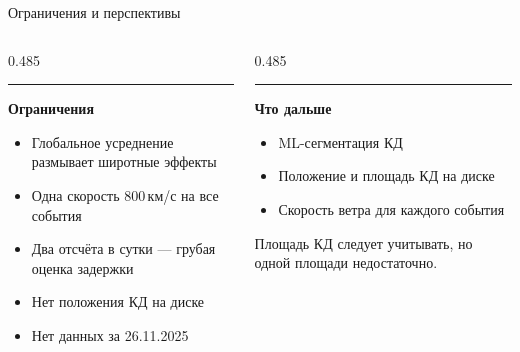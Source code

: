 \documentclass[aspectratio=169,11pt]{beamer}
\begin{document}
\begin{frame}[t]{Ограничения и перспективы}
\begin{columns}[T,onlytextwidth]
\begin{column}[T]{0.485\textwidth}
  {\color{muted}\rule{\linewidth}{1.4pt}}\par\vspace{1.6mm}
  {\bfseries Ограничения}\par\vspace{1mm}
  {\footnotesize
  \begin{itemize}
    \item Глобальное усреднение размывает широтные эффекты
    \item Одна скорость 800\,км/с на все события
    \item Два отсчёта в сутки --- грубая оценка задержки
    \item Нет положения КД на диске
    \item Нет данных за 26.11.2025
  \end{itemize}}
\end{column}
\begin{column}[T]{0.485\textwidth}
  {\color{sun}\rule{\linewidth}{1.4pt}}\par\vspace{1.6mm}
  {\bfseries Что дальше}\par\vspace{1mm}
  {\footnotesize
  \begin{itemize}
    \item ML-сегментация КД
    \item Положение и площадь КД на диске
    \item Скорость ветра для каждого события
  \end{itemize}}
  \vspace{2mm}
  {\scriptsize\color{muted}Площадь КД следует учитывать, но одной
   площади недостаточно.}
\end{column}
\end{columns}
\end{frame}
\end{document}
